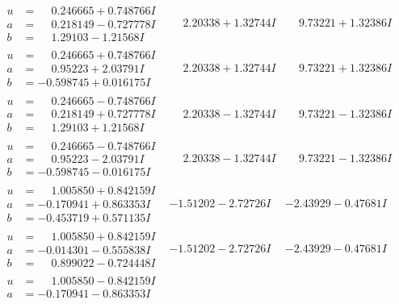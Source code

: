 \documentclass[1p]{elsarticle_modified}
\theoremstyle{definition}
\begin{document}
$$\begin{array}{c|c|c}
\begin{aligned}
u &= \phantom{-}0.246665 + 0.748766 I \\
a &= \phantom{-}0.218149 - 0.727778 I \\
b &= \phantom{-}1.29103 - 1.21568 I\end{aligned}
 & \phantom{-}2.20338 + 1.32744 I & \phantom{-}9.73221 + 1.32386 I \\ \hline\begin{aligned}
u &= \phantom{-}0.246665 + 0.748766 I \\
a &= \phantom{-}0.95223 + 2.03791 I \\
b &= -0.598745 + 0.016175 I\end{aligned}
 & \phantom{-}2.20338 + 1.32744 I & \phantom{-}9.73221 + 1.32386 I \\ \hline\begin{aligned}
u &= \phantom{-}0.246665 - 0.748766 I \\
a &= \phantom{-}0.218149 + 0.727778 I \\
b &= \phantom{-}1.29103 + 1.21568 I\end{aligned}
 & \phantom{-}2.20338 - 1.32744 I & \phantom{-}9.73221 - 1.32386 I \\ \hline\begin{aligned}
u &= \phantom{-}0.246665 - 0.748766 I \\
a &= \phantom{-}0.95223 - 2.03791 I \\
b &= -0.598745 - 0.016175 I\end{aligned}
 & \phantom{-}2.20338 - 1.32744 I & \phantom{-}9.73221 - 1.32386 I \\ \hline\begin{aligned}
u &= \phantom{-}1.005850 + 0.842159 I \\
a &= -0.170941 + 0.863353 I \\
b &= -0.453719 + 0.571135 I\end{aligned}
 & -1.51202 - 2.72726 I & -2.43929 - 0.47681 I \\ \hline\begin{aligned}
u &= \phantom{-}1.005850 + 0.842159 I \\
a &= -0.014301 - 0.555838 I \\
b &= \phantom{-}0.899022 - 0.724448 I\end{aligned}
 & -1.51202 - 2.72726 I & -2.43929 - 0.47681 I \\ \hline\begin{aligned}
u &= \phantom{-}1.005850 - 0.842159 I \\
a &= -0.170941 - 0.863353 I \\

\end{aligned}
\end{array}$$
\end{document}
